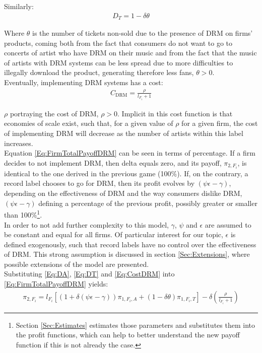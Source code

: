 \documentclass[a4paper,12pt]{article}
\numberwithin{equation}{section}
\newcommand{\drm}{\text{DRM}}
\newcommand{\firmpayoff}[2]{\pi_{{#1}, F_{#2}}}
\newcommand{\firmalbum}[2]{\pi_{#1, F_{#2}, A}}
\newcommand{\firmticket}[2]{\pi_{#1, F_{#2}, T}}
\newcommand{\drminf}{(\psi \epsilon - \gamma)}
\begin{document}
Similarly:
\begin{eqnarray}
D_T = 1 - \delta \theta
\label{Eq:DT}
\end{eqnarray}

Where $\theta$ is the number of tickets non-sold due to the presence of DRM on firms’ products, coming both from the fact that consumers do not want to go to concerts of artist who have DRM on their music and from the fact that the music of artists with DRM systems can be less spread due to more difficulties to illegally download the product, generating therefore less fans, $\theta > 0$.\\

Eventually, implementing DRM systems has a cost:
\begin{eqnarray}
C_\drm = \frac{\rho}{l_{F_i} + 1}
\label{Eq:CostDRM}
\end{eqnarray}

$\rho$ portraying the cost of DRM, $\rho > 0$. Implicit in this cost function is that economies of scale exist, such that, for a given value of $\rho$ for a given firm, the cost of implementing DRM will decrease as the number of artists within this label increases.\\

Equation \eqref{Eq:FirmTotalPayoffDRM} can be seen in terms of percentage. If a firm decides to not implement DRM, then delta equals zero, and its payoff, $\firmpayoff{2}{i}$, is identical to the one derived in the previous game (100\%). If, on the contrary, a record label chooses to go for DRM, then its profit evolves by $\drminf$, depending on the effectiveness of DRM and the way consumers dislike DRM, $\drminf$ defining a percentage of the previous profit, possibly greater or smaller than 100\%\footnote {
Section \ref{Sec:Estimates} estimates those parameters and substitutes them into the profit functions, which can help to better understand the new payoff function if this is not already the case.
}.\\

In order to not add further complexity to this model, $\gamma$, $\psi$ and $\epsilon$ are assumed to be constant and equal for all firms. Of particular interest for our topic, $\epsilon$ is defined exogenously, such that record labels have no control over the effectiveness of DRM. This strong assumption is discussed in section \ref{Sec:Extensions}, where possible extensions of the model are presented.\\

Substituting \eqref{Eq:DA}, \eqref{Eq:DT} and \eqref{Eq:CostDRM} into \eqref{Eq:FirmTotalPayoffDRM} yields:
\begin{eqnarray}
\firmpayoff{2}{i} = l_{F_i} \left[
	(1 + \delta \drminf) \firmalbum{1}{i} +
	(1 - \delta \theta) \firmticket{1}{i}
\right]
- \delta \left( \frac{\rho}{l_{F_i} + 1} \right)
\end{eqnarray}
\end{document}
